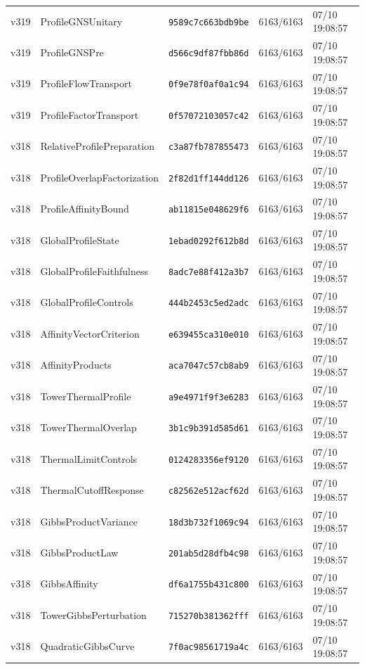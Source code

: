 \documentclass[11pt]{article}
\theoremstyle{definition}\newtheorem{deriv}{Derivação}
\begin{document}
{\begin{longtable}{@{}lllll@{}}
v319 & ProfileGNSUnitary & \texttt{9589c7c663bdb9be} & 6163/6163 & 07/10 19:08:57 \\
v319 & ProfileGNSPre & \texttt{d566c9df87fbb86d} & 6163/6163 & 07/10 19:08:57 \\
v319 & ProfileFlowTransport & \texttt{0f9e78f0af0a1c94} & 6163/6163 & 07/10 19:08:57 \\
v319 & ProfileFactorTransport & \texttt{0f57072103057c42} & 6163/6163 & 07/10 19:08:57 \\
v318 & RelativeProfilePreparation & \texttt{c3a87fb787855473} & 6163/6163 & 07/10 19:08:57 \\
v318 & ProfileOverlapFactorization & \texttt{2f82d1ff144dd126} & 6163/6163 & 07/10 19:08:57 \\
v318 & ProfileAffinityBound & \texttt{ab11815e048629f6} & 6163/6163 & 07/10 19:08:57 \\
v318 & GlobalProfileState & \texttt{1ebad0292f612b8d} & 6163/6163 & 07/10 19:08:57 \\
v318 & GlobalProfileFaithfulness & \texttt{8adc7e88f412a3b7} & 6163/6163 & 07/10 19:08:57 \\
v318 & GlobalProfileControls & \texttt{444b2453c5ed2adc} & 6163/6163 & 07/10 19:08:57 \\
v318 & AffinityVectorCriterion & \texttt{e639455ca310e010} & 6163/6163 & 07/10 19:08:57 \\
v318 & AffinityProducts & \texttt{aca7047c57cb8ab9} & 6163/6163 & 07/10 19:08:57 \\
v318 & TowerThermalProfile & \texttt{a9e4971f9f3e6283} & 6163/6163 & 07/10 19:08:57 \\
v318 & TowerThermalOverlap & \texttt{3b1c9b391d585d61} & 6163/6163 & 07/10 19:08:57 \\
v318 & ThermalLimitControls & \texttt{0124283356ef9120} & 6163/6163 & 07/10 19:08:57 \\
v318 & ThermalCutoffResponse & \texttt{c82562e512acf62d} & 6163/6163 & 07/10 19:08:57 \\
v318 & GibbsProductVariance & \texttt{18d3b732f1069c94} & 6163/6163 & 07/10 19:08:57 \\
v318 & GibbsProductLaw & \texttt{201ab5d28dfb4c98} & 6163/6163 & 07/10 19:08:57 \\
v318 & GibbsAffinity & \texttt{df6a1755b431c800} & 6163/6163 & 07/10 19:08:57 \\
v318 & TowerGibbsPerturbation & \texttt{715270b381362fff} & 6163/6163 & 07/10 19:08:57 \\
v318 & QuadraticGibbsCurve & \texttt{7f0ac98561719a4c} & 6163/6163 & 07/10 19:08:57 \\

\end{longtable}}
\end{document}
